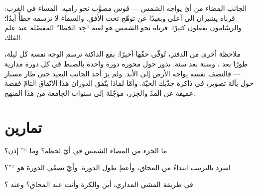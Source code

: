 \begin{example}\label{ex:g7:moon-phases:points}
الجانب المضاء من أيّ  يواجه الشمس ---  قوس مصوَّب نحو
راميه.  المساء في الغرب: قرناه يشيران إلى أعلى وبعيدًا عن
توهّج  تحت الأفق. والسماء لا ترسمه خطأً أبدًا؛ والرسّامون
يفعلون كثيرًا.  قرناه نحو الشمس هو لعبة ``جِد الخطأ''
المفضّلة عند علم الفلك.
\end{example}

\begin{remark}\label{rem:g7:moon-phases:sameface}
ملاحظة أخرى من الدفتر، تُوفّى حقّها أخيرًا: بقع  الداكنة
ترسم الوجه نفسه كل ليلة، طورًا بعد ، وسنة بعد سنة. 
يدور حول محوره دورة واحدة بالضبط في كل دورة مدارية --- فالنصف
نفسه يواجه الأرض إلى الأبد. ولم يرَ أحد الجانب البعيد حتى طار
مسبار حول  بآلة تصوير، في ذاكرة جدّيك الحيّة. وأمّا لماذا
يتّفق الدوران  هذا الاتّفاق التامّ فقصة عميقة عن المدّ
والجزر، مؤجّلة إلى سنوات الجامعة من هذا المنهج.
\end{remark}

\section{تمارين}

\begin{exercise}[$\star$]\label{exo:g7:moon-phases:1}
ما الجزء من  المضاء  الشمس في أيّ لحظة؟ وما ``''
إذن؟
\end{exercise}

\begin{exercise}[$\star$]\label{exo:g7:moon-phases:2}
اسرد  بالترتيب ابتداءً من المحاق، وأعطِ طول الدورة. وأيّ
نصفَي الدورة هو ``''؟
\end{exercise}

\begin{exercise}[$\star$]\label{exo:g7:moon-phases:3}
في طريقة المشي المداري، أين  والكرة وأنت عند المحاق؟
وعند ؟
\end{exercise}

